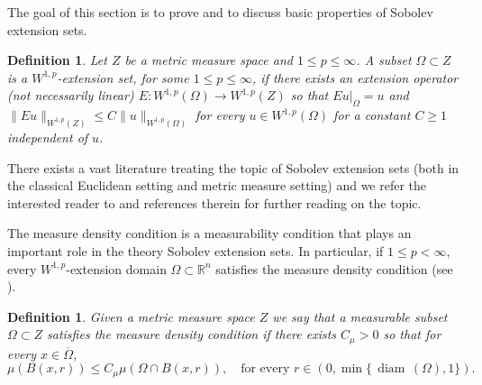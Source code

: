 \documentclass[reqno]{amsart}
\numberwithin{equation}{section}
\newtheorem{definition}[theorem]{Definition}
\theoremstyle{remark}
\DeclareMathOperator{\diam}{diam}
\def\diam{{\mathop\mathrm{\,diam\,}}}
\begin{document}
The goal of this section is to prove  and to discuss basic properties of Sobolev extension sets.
\begin{definition}\label{def:sob_ext_set}
Let $Z$ be a metric measure space and $1\leq p\leq \infty$. A subset $\Omega\subset Z$ is a $W^{1,p}$-extension set, for some $1\leq p\leq \infty$, if there exists an extension operator (not necessarily linear) $E\colon W^{1,p}(\Omega)\to W^{1,p}(Z)$ so that $Eu|_{\Omega}=u$ and $\|Eu\|_{W^{1,p}(Z)}\leq C\|u\|_{W^{1,p}(\Omega)}$ for every $u\in W^{1,p}(\Omega)$ for a constant $C\geq 1$ independent of $u$.
\end{definition}
There exists a vast literature treating the topic of Sobolev extension sets (both in the classical Euclidean setting and metric measure setting) and we refer the interested reader to \cite{HKT2008:B,HKT2008,Garc:Iko:Zhu:23} and references therein for further reading on the topic.

The measure density condition is a measurability condition that plays an important role in the theory Sobolev extension sets. In particular, if $1\leq p<\infty$, every $W^{1,p}$-extension domain $\Omega \subset \mathbb{R}^{n}$ satisfies the measure density condition (see \cite{HKT2008}). 


\begin{definition}
    Given a metric measure space $Z$ we say that a measurable subset $\Omega\subset Z$ satisfies the measure density condition if there exists $C_{\mu}>0$ so that for every $x\in\overline{\Omega}$,
    $$\mu (B(x,r))\leq C_\mu \mu(\Omega\cap B(x,r)),\quad \text{for every } r\in (0,\min\{\diam(\Omega),1\}) .$$
\end{definition}
\end{document}
